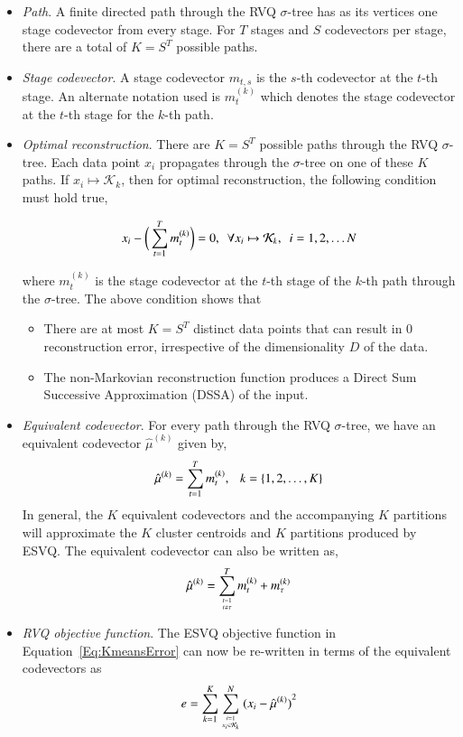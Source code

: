 \begin{itemize}
\item \emph{Path}.  A finite directed path through the RVQ $\sigma$-tree has as its vertices one stage codevector from every stage.  For $T$ stages and $S$ codevectors per stage, there are a total of $K = S^T$ possible paths.
\item \emph{Stage codevector}.  A stage codevector $m_{t, s}$ is the $s$-th codevector at the $t$-th stage.  An alternate notation used is $m^{(k)}_t$ which denotes the stage codevector at the $t$-th stage for the $k$-th path.
\item \emph{Optimal reconstruction}.  There are $K=S^T$ possible paths through the RVQ $\sigma$-tree.  Each data point $x_i$ propagates through the $\sigma$-tree on one of these $K$ paths.  If $x_i \mapsto \mathcal{K}_k$, then for optimal reconstruction, the following condition must hold true,

\begin{equation*}
x_i -\bigg(\sum_{t=1}^Tm^{(k)}_t\bigg) = 0, \ \ \forall x_i \mapsto \mathcal{K}_k, \ \ i =1, 2, \ldots N\\
\end{equation*}

where $m^{(k)}_t$ is the stage codevector at the $t$-th stage of the $k$-th path through the $\sigma$-tree.  The above condition shows that

\begin{itemize} 
\item There are at most $K=S^T$ distinct data points that can result in 0 reconstruction error, irrespective of the dimensionality $D$ of the data. 
\item The non-Markovian reconstruction function produces a Direct Sum Successive Approximation (DSSA) of the input.
\end{itemize}\item \emph{Equivalent codevector}.  For every path through the RVQ $\sigma$-tree, we have an equivalent codevector $\hat{\mu}^{(k)}$ given by,
\begin{equation}
\hat{\mu}^{(k)} = \sum_{t=1 }^Tm^{(k)}_t, \ \ \ k=\{1, 2, \ldots, K\}
\end{equation}
In general, the $K$ equivalent codevectors and the accompanying $K$ partitions will approximate the $K$ cluster centroids and $K$ partitions produced by ESVQ.  The equivalent codevector can also be written as,
\begin{equation}
\label{Eq:RVQequivalentCodevectorBroken}
\hat{\mu}^{(k)} = \sum_{t=1 \atop t \neq \tau}^Tm^{(k)}_t+ m^{(k)}_\tau
\end{equation}
\item \emph{RVQ objective function}.  The ESVQ objective function in Equation~\ref{Eq:KmeansError} can now be re-written in terms of the equivalent codevectors as 
\begin{equation}
e = \sum\limits_{k=1}^K \sum\limits_{{i=1 \atop x_i \in \mathcal{K}_k}}^N {(x_i - \hat{\mu}^{(k)})}^2
\end{equation}
\end{itemize}

